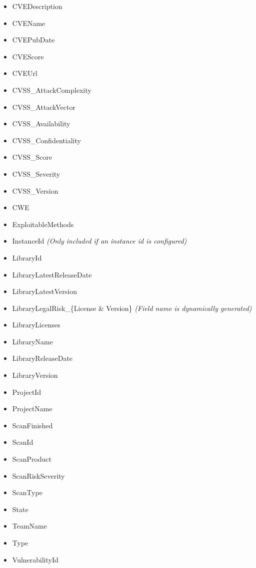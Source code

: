 \begin{itemize}
    \item CVEDescription
    \item CVEName
    \item CVEPubDate
    \item CVEScore
    \item CVEUrl
    \item CVSS\_AttackComplexity
    \item CVSS\_AttackVector
    \item CVSS\_Availability
    \item CVSS\_Confidentiality
    \item CVSS\_Score
    \item CVSS\_Severity
    \item CVSS\_Version
    \item CWE
    \item ExploitableMethods
    \item InstanceId \textit{(Only included if an instance id is configured)}
    \item LibraryId
    \item LibraryLatestReleaseDate
    \item LibraryLatestVersion
    \item LibraryLegalRisk\_\{License \& Version\} \textit{(Field name is dynamically generated)}
    \item LibraryLicenses
    \item LibraryName
    \item LibraryReleaseDate
    \item LibraryVersion
    \item ProjectId
    \item ProjectName
    \item ScanFinished
    \item ScanId
    \item ScanProduct
    \item ScanRiskSeverity
    \item ScanType
    \item State
    \item TeamName
    \item Type
    \item VulnerabilityId
\end{itemize}


